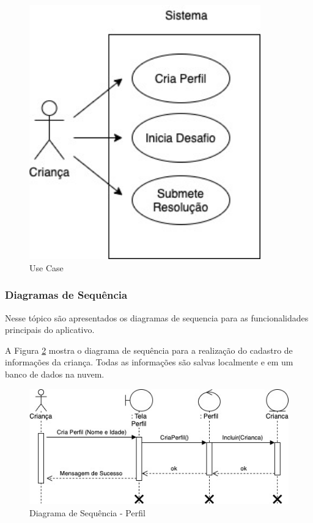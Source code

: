         \begin{figure}[H]
            \caption{Use Case}
            \centering
                \includegraphics[width=10cm]{Imagens/Cap3/Use Case.jpg}
    
            \label{figura:use_case}
        \end{figure}
        
        \subsubsection{Diagramas de Sequência}
        
        Nesse tópico são apresentados os diagramas de sequencia para as funcionalidades principais do aplicativo.
        
        
        A Figura \ref{figura:sequencia_perfil} mostra o diagrama de sequência para a realização do cadastro de informações da criança. Todas as informações são salvas localmente e em um banco de dados na nuvem.
        
        \begin{figure}[H]
            \caption{Diagrama de Sequência - Perfil}
            \centering
                \includegraphics[width=\linewidth]{Imagens/Cap3/Sequencia_Perfil.jpg}
    
            \label{figura:sequencia_perfil}
        \end{figure}
        
